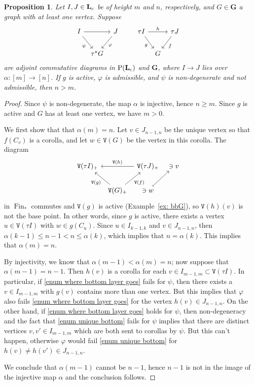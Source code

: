 \documentclass{amsart}
\numberwithin{theorem}{subsection}
\newtheorem{proposition}[theorem]{Proposition}
\theoremstyle{definition}
\newcommand{\finset}{\operatorname{Fin}}
\newcommand{\pfinset}{\finset_*}
\newcommand{\Pre}{\name{P}}
\newcommand{\name}[1]{\ensuremath{\text{\textup{#1}}}}
\newcommand{\levelg}{\mathbf{L}}
\newcommand{\levelgconn}{\levelg_{\name{c}}}
\newcommand{\bbY}{\mathbf{G}}
\newcommand{\vertex}{\mathtt{V}}
\begin{document}
\begin{proposition}\label{proposition about heights and factorizations}
Let $I,J \in \levelgconn$ be of height $m$ and $n$, respectively, and $G\in \bbY$ a graph with at least one vertex.
Suppose 
\[
\begin{tikzcd}[column sep=tiny]
I \arrow[rr] \arrow[dr,"\psi" swap] & & J \arrow[dl,"\varphi"] \\
& \tau^*G
\end{tikzcd}\qquad 
\begin{tikzcd}[column sep=tiny]
\tau I \arrow[rr,"h"] \arrow[dr,"g" swap] & & \tau J \arrow[dl,"f"] \\
& G
\end{tikzcd}
\]
are adjoint commutative diagrams in $\Pre(\levelgconn)$ and $\bbY$, where $I\to J$ lies over $\alpha \colon [m] \to [n]$.
If $g$ is active, $\varphi$ is admissible, and $\psi$ is non-degenerate and not admissible, then $n > m$.
\end{proposition}
\begin{proof}
Since $\psi$ is non-degenerate, the map $\alpha$ is injective, hence $n\geq m$.
Since $g$ is active and $G$ has at least one vertex, we have $m > 0$.

We first show that that $\alpha(m) = n$.
Let $v \in J_{n-1,n}$ be the unique vertex so that $f(C_{v})$ is a corolla, and let $w\in \vertex(G)$ be the vertex in this corolla.
The diagram
\[
\begin{tikzcd}[column sep=tiny]
\vertex(\tau I)_+ & & \vertex(\tau J)_+ \arrow[ll,"\vertex(h)" swap] & \ni v \\
& \vertex(G)_+  \arrow[ur,"\vertex(f)" swap]  \arrow[ul,"\vertex(g)"] & \ni w \arrow[ur, mapsto]
\end{tikzcd}
\]
in $\pfinset$ commutes and $\vertex(g)$ is active (Example~\ref{ex: bbG}), so $\vertex(h)(v)$ is not the base point.
In other words, since $g$ is active, there exists a vertex $u \in \vertex(\tau I)$ with $w\in g(C_{u})$.
Since $u\in I_{k-1,k}$ and $v \in J_{n-1,n}$, then $\alpha(k-1) \leq n-1 < n \leq \alpha(k)$, which implies that $n = \alpha(k)$.
This implies that $\alpha(m) = n$.

By injectivity, we know that $\alpha(m-1) < \alpha(m) = n$; now suppose that $\alpha(m-1) = n - 1$. 
Then $h(v)$ is a corolla for each $v\in I_{m-1,m} \subset \vertex(\tau I)$.
In particular, if \eqref{enum where bottom layer goes} fails for $\psi$, then there exists a $v\in I_{m-1,m}$ with $g(v)$ contains more than one vertex.
But this implies that $\varphi$ also fails \eqref{enum where bottom layer goes} for the vertex $h(v) \in J_{n-1,n}$.
On the other hand, if \eqref{enum where bottom layer goes} holds for $\psi$, then non-degeneracy and the fact that \eqref{enum unique bottom} fails for $\psi$ implies that there are distinct vertices $v,v' \in I_{m-1,m}$ which are both sent to corollas by $\psi$.
But this can't happen, otherwise $\varphi$ would fail \eqref{enum unique bottom} for $h(v) \neq h(v') \in J_{n-1,n}$.

We conclude that $\alpha(m-1)$ cannot be $n-1$, hence $n-1$ is not in the image of the injective map $\alpha$ and the conclusion follows.
\end{proof}
\end{document}
